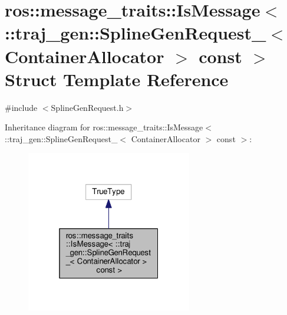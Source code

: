 \hypertarget{structros_1_1message__traits_1_1_is_message_3_01_1_1traj__gen_1_1_spline_gen_request___3_01_cont7d03306f145aa00d3e34e56fc26214ae}{}\section{ros\+:\+:message\+\_\+traits\+:\+:Is\+Message$<$ \+:\+:traj\+\_\+gen\+:\+:Spline\+Gen\+Request\+\_\+$<$ Container\+Allocator $>$ const $>$ Struct Template Reference}
\label{structros_1_1message__traits_1_1_is_message_3_01_1_1traj__gen_1_1_spline_gen_request___3_01_cont7d03306f145aa00d3e34e56fc26214ae}


{\ttfamily \#include $<$Spline\+Gen\+Request.\+h$>$}



Inheritance diagram for ros\+:\+:message\+\_\+traits\+:\+:Is\+Message$<$ \+:\+:traj\+\_\+gen\+:\+:Spline\+Gen\+Request\+\_\+$<$ Container\+Allocator $>$ const $>$\+:
\nopagebreak
\begin{figure}[H]
\begin{center}
\leavevmode
\includegraphics[width=205pt]{structros_1_1message__traits_1_1_is_message_3_01_1_1traj__gen_1_1_spline_gen_request___3_01_cont44f8d1fcf0efe196021563aa2c9fe189}
\end{center}
\end{figure}



